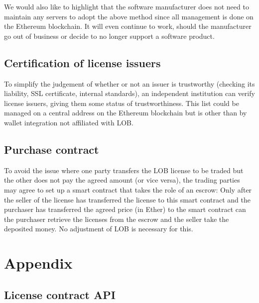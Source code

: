\documentclass[a4paper]{article}
\begin{document}
We would also like to highlight that the software manufacturer does not need to maintain any servers to adopt the above method since all management is done on the Ethereum blockchain. It will even continue to work, should the manufacturer go out of business or decide to no longer support a software product.





\subsection{Certification of license issuers}
\label{ch:licenseIssuerValidation}

To simplify the judgement of whether or not an issuer is trustworthy (checking its liability, SSL certificate, internal standards), an independent institution can verify license issuers, giving them some status of trustworthiness. This list could be managed on a central address on the Ethereum blockchain but is other than by wallet integration not affiliated with LOB.





\subsection{Purchase contract}
\label{ch:purchaseContract}

To avoid the issue where one party transfers the LOB license to be traded but the other does not pay the agreed amount (or vice versa), the trading parties may agree to set up a smart contract that takes the role of an escrow: Only after the seller of the license has transferred the license to this smart contract and the purchaser has transferred the agreed price (in Ether) to the smart contract can the purchaser retrieve the licenses from the escrow and the seller take the deposited money. No adjustment of LOB is necessary for this.





\clearpage

\section{Appendix}

\subsection{License contract API}
\label{ch:licenseContractAPI}
\end{document}
